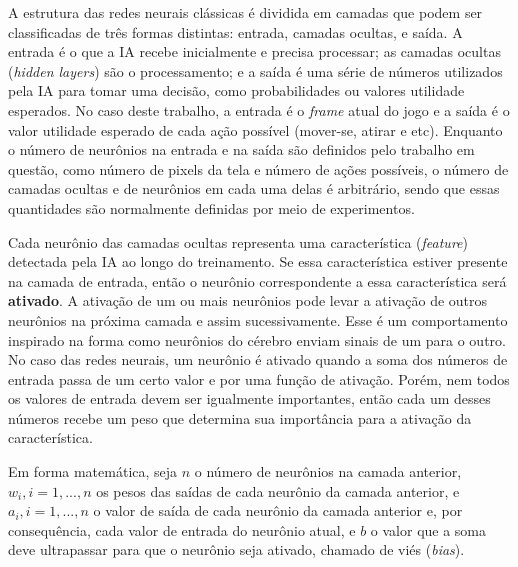 A estrutura das redes neurais clássicas é dividida em camadas que podem ser classificadas de três formas distintas: entrada, camadas ocultas, e saída.
A entrada é o que a IA recebe inicialmente e precisa processar; as camadas ocultas (\textit{hidden layers}) são o processamento; e a saída é uma série de números utilizados pela IA para tomar uma decisão, como probabilidades ou valores utilidade esperados. No caso deste trabalho, a entrada é o \textit{frame} atual do jogo e a saída é o valor utilidade esperado de cada ação possível (mover-se, atirar e etc).
Enquanto o número de neurônios na entrada e na saída são definidos pelo trabalho em questão, como número de pixels da tela e número de ações possíveis, o número de camadas ocultas e de neurônios em cada uma delas é arbitrário, sendo que essas quantidades são normalmente definidas por meio de experimentos.

Cada neurônio das camadas ocultas representa uma característica (\textit{feature}) detectada pela IA ao longo do treinamento. Se essa característica estiver presente na camada de entrada, então o neurônio correspondente a essa característica será \textbf{ativado}. A ativação de um ou mais neurônios pode levar a ativação de outros neurônios na próxima camada e assim sucessivamente. Esse é um comportamento inspirado na forma como neurônios do cérebro enviam sinais de um para o outro. No caso das redes neurais, um neurônio é ativado quando a soma dos números de entrada passa de um certo valor e por uma função de ativação. Porém, nem todos os valores de entrada devem ser igualmente importantes, então cada um desses números recebe um peso que determina sua importância para a ativação da característica.

Em forma matemática, seja $n$ o número de neurônios na camada anterior, $w_{i}, i = 1, ..., n$ os pesos das saídas de cada neurônio da camada anterior, e $a_{i}, i = 1, ..., n$ o valor de saída de cada neurônio da camada anterior e, por consequência, cada valor de entrada do neurônio atual, e $b$ o valor que a soma deve ultrapassar para que o neurônio seja ativado, chamado de viés (\textit{bias}).

